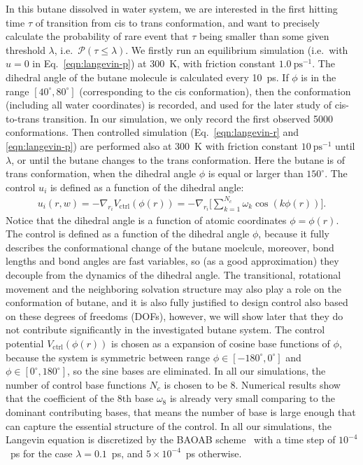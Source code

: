 \documentclass[final]{siamltex}
\begin{document}
In this butane dissolved in water system, we are interested in the
first hitting time $\tau$ of transition from cis to trans
conformation, and want to precisely calculate the probability of rare
event that $\tau$ being smaller than some given threshold $\lambda$,
i.e.~$\mathcal{P}(\tau \leq\lambda)$. We firstly run an equilibrium simulation
(i.e.~with $u = 0$ in Eq.~\eqref{eqn:langevin-p}) at 300~K, with
friction constant $1.0~\textrm{ps}^{-1}$.  The dihedral angle of the
butane molecule is calculated every 10~ps. If $\phi$ is in the range
$[40^\circ, 80^\circ]$ (corresponding to the cis conformation), then
the conformation (including all water coordinates) is recorded, and
used for the later study of cis-to-trans transition. In our
simulation, we only record the first observed 5000 conformations.
Then controlled simulation (Eq.~\eqref{eqn:langevin-r} and
\eqref{eqn:langevin-p}) are performed also at 300~K with friction
constant $10~\textrm{ps}^{-1}$ until $\lambda$, or until the butane
changes to the trans conformation. Here the butane is of trans
conformation, when the dihedral angle $\phi$ is equal or larger than
$150^\circ$. The control  $u_i$ is defined as a function of
the dihedral angle:
\begin{align}
  u_i(r, w) = -\nabla_{r_i}V_{\textrm{ctrl}}(\phi(r))=
  -\nabla_{r_i} \bigg[ \sum_{k=1}^{N_c} \omega_k\cos(k \phi (r)) \bigg].
\end{align}
Notice that the dihedral angle is a function of atomic coordinates
$\phi = \phi(r)$.  The control is defined as a function of the
dihedral angle $\phi$, because it fully describes the conformational
change of the butane moelcule, moreover, bond lengths and bond angles
are fast variables, so (as a good approximation) they decouple from
the dynamics of the dihedral angle.  The transitional, rotational
movement and the neighboring solvation structure may also play a role
on the conformation of butane, and it is also fully justified to
design control also based on these degrees of freedoms (DOFs), however, we
will show later that they do not contribute significantly in the
investigated butane system.  The control potential
$V_{\textrm{ctrl}}(\phi(r))$ is chosen as a expansion of cosine base
functions of $\phi$, because the system is symmetric between range $\phi \in
[-180^\circ,0^\circ]$ and $\phi \in [0^\circ, 180^\circ]$, so the sine
bases are eliminated. In all our simulations, the number of control
base functions $N_c$ is chosen to be 8. Numerical results show that
the coefficient of the 8th base $\omega_8$ is already very small comparing
to the dominant contributing bases, that means the number of base is
large enough that can capture the essential structure of the control.
In all our simulations, the Langevin equation is discretized by the
BAOAB scheme~\cite{leimkuhler2013rational} with a time step of
$10^{-4}$~ps for the case $\lambda = 0.1$~ps, and $5\times10^{-4}$~ps
otherwise.
\end{document}
